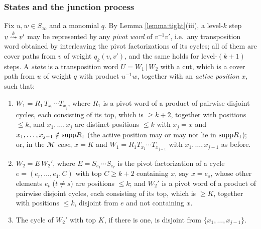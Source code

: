 \documentclass{amsart}
\theoremstyle{definition}
\theoremstyle{remark}
\numberwithin{equation}{section}
\newcommand{\xrightsquigarrow}[2][]{%
	\mathrel{\mathop{\rightsquigarrow}\limits^{\scriptstyle #2}%
	\ifx\hfuzz#1\hfuzz\else_{\scriptstyle #1}\fi}%
}
\newcommand{\tom}[1]{\ensuremath{\xrightsquigarrow{#1}}}
\begin{document}
\subsubsection*{States and the junction process}
Fix $u,w\in S_\infty$ and a monomial $q$. By Lemma \ref{lemma:tight}(iii), a level-$k$ step $v\tom{k}v'$ may be represented by any \emph{pivot word} of $v^{-1}v'$, i.e.\ any transposition word obtained by interleaving the pivot factorizations of its cycles; all of them are cover paths from $v$ of weight $q_k(v,v')$, and the same holds for level-$(k+1)$ steps. A \emph{state} is a transposition word $U=W_1\,|\,W_2$ with a cut, which is a cover path from $u$ of weight $q$ with product $u^{-1}w$, together with an \emph{active position} $x$, such that:
\begin{enumerate}
\item[(S1)] $W_1=R_1\,T_{x_1}\cdots T_{x_j}$, where $R_1$ is a pivot word of a product of pairwise disjoint cycles, each consisting of its top, which is $\geq k+2$, together with positions $\leq k$, and $x_1,\ldots,x_j$ are distinct positions $\leq k$ with $x_j=x$ and $x_1,\ldots,x_{j-1}\notin\mathrm{supp} R_1$ (the active position may or may not lie in $\mathrm{supp} R_1$); or, in the \emph{$\mathcal M$ case}, $x=K$ and $W_1=R_1T_{x_1}\cdots T_{x_{j-1}}$ with $x_1,\ldots,x_{j-1}$ as before.
\item[(S2)] $W_2=E\,W_2'$, where $E=S_{e_1}\cdots S_{e_r}$ is the pivot factorization of a cycle $e=(e_r,\ldots,e_1,C)$ with top $C\geq k+2$ containing $x$, say $x=e_s$, whose other elements $e_t$ ($t\neq s$) are positions $\leq k$; and $W_2'$ is a pivot word of a product of pairwise disjoint cycles, each consisting of its top, which is $\geq K$, together with positions $\leq k$, disjoint from $e$ and not containing $x$.
\item[(S3)] The cycle of $W_2'$ with top $K$, if there is one, is disjoint from $\{x_1,\ldots,x_{j-1}\}$.
\end{enumerate}
\end{document}
